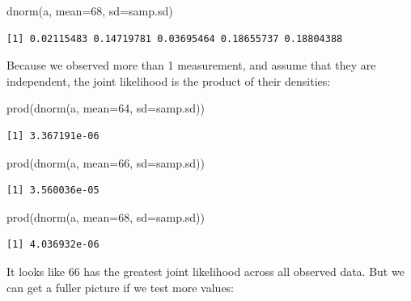 \documentclass[
  13,
  letterpaper,
]{report}
\newenvironment{Shaded}{\begin{snugshade}}{\end{snugshade}}
\newcommand{\AttributeTok}[1]{\textcolor[rgb]{0.40,0.45,0.13}{#1}}
\newcommand{\DecValTok}[1]{\textcolor[rgb]{0.68,0.00,0.00}{#1}}
\newcommand{\FunctionTok}[1]{\textcolor[rgb]{0.28,0.35,0.67}{#1}}
\newcommand{\NormalTok}[1]{\textcolor[rgb]{0.00,0.23,0.31}{#1}}
\begin{document}
\begin{Shaded}
\begin{Highlighting}[]
\FunctionTok{dnorm}\NormalTok{(a, }\AttributeTok{mean=}\DecValTok{68}\NormalTok{, }\AttributeTok{sd=}\NormalTok{samp.sd)}
\end{Highlighting}
\end{Shaded}

\begin{verbatim}
[1] 0.02115483 0.14719781 0.03695464 0.18655737 0.18804388
\end{verbatim}

Because we observed more than 1 measurement, and assume that they are
independent, the joint likelihood is the product of their densities:

\begin{Shaded}
\begin{Highlighting}[]
\FunctionTok{prod}\NormalTok{(}\FunctionTok{dnorm}\NormalTok{(a, }\AttributeTok{mean=}\DecValTok{64}\NormalTok{, }\AttributeTok{sd=}\NormalTok{samp.sd))}
\end{Highlighting}
\end{Shaded}

\begin{verbatim}
[1] 3.367191e-06
\end{verbatim}

\begin{Shaded}
\begin{Highlighting}[]
\FunctionTok{prod}\NormalTok{(}\FunctionTok{dnorm}\NormalTok{(a, }\AttributeTok{mean=}\DecValTok{66}\NormalTok{, }\AttributeTok{sd=}\NormalTok{samp.sd))}
\end{Highlighting}
\end{Shaded}

\begin{verbatim}
[1] 3.560036e-05
\end{verbatim}

\begin{Shaded}
\begin{Highlighting}[]
\FunctionTok{prod}\NormalTok{(}\FunctionTok{dnorm}\NormalTok{(a, }\AttributeTok{mean=}\DecValTok{68}\NormalTok{, }\AttributeTok{sd=}\NormalTok{samp.sd))}
\end{Highlighting}
\end{Shaded}

\begin{verbatim}
[1] 4.036932e-06
\end{verbatim}

It looks like 66 has the greatest joint likelihood across all observed
data. But we can get a fuller picture if we test more values:
\end{document}
